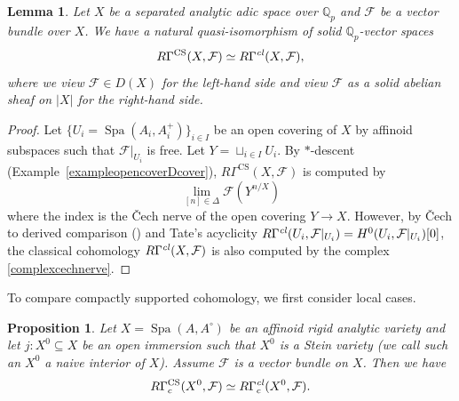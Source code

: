 \documentclass[a4paper,10pt]{amsart}
\theoremstyle{remark}
\theoremstyle{definition}
\theoremstyle{plain}
\newtheorem{lemma}[theorem]{Lemma}
\newtheorem{proposition}[theorem]{Proposition}
\numberwithin{equation}{section}
\newcommand{\bbQ}{{\mathbb Q}}
\newcommand{\calF}{{\mathcal F}}
\newcommand{\CS}{\ensuremath{\mathrm{CS}}}
\DeclareMathOperator{\Spa}{Spa}
\begin{document}
\begin{lemma}\label{comparisoncohomology}
	Let $X$ be a separated analytic adic space over $\bbQ_p$ and $\calF$ be a vector bundle over $X$. We have a natural quasi-isomorphism of solid $\bbQ_p$-vector spaces $$R\Gamma^{\CS}(X,\calF)\simeq R\Gamma^{\it cl}(X,\calF),$$
	where we view $\calF\in D(X)$ for the left-hand side and view $\calF$ as a solid abelian sheaf on $|X|$ for the right-hand side.	
\end{lemma}
\begin{proof}
	Let $\{U_i=\Spa(A_i,A_i^+)\}_{i\in I}$ be an open covering of $X$ by affinoid subspaces such that $\calF|_{U_i}$ is free. Let $Y=\sqcup_{i\in I} U_i$. By $*$-descent (Example~\ref{exampleopencoverDcover}), $R\Gamma^{\CS}(X,\calF)$ is computed by 
	\begin{equation}\label{complexcechnerve}
	\lim_{[n]\in \Delta} \calF(Y^{n/X})
	\end{equation}
	where the index is the \v{C}ech nerve of the open covering $Y\to X$. However, by \v{C}ech to derived comparison (\cite[\href{https://stacks.math.columbia.edu/tag/03F9}{Tag 03F9}]{stacks-project}) and Tate's acyclicity $R\Gamma^{\it cl}(U_i,\calF|_{U_i})=H^0(U_i,\calF|_{U_i})[0]$, the classical cohomology $R\Gamma^{\it cl}(X,\calF)$ is also computed by the complex \eqref{complexcechnerve}.
\end{proof}


To compare compactly supported cohomology, we first consider local cases.


	




\begin{proposition}\label{naiveinterior}
	Let $X=\Spa(A,A^{\circ})$ be an affinoid rigid analytic variety and let $j:X^0\subseteq X$ be an open immersion such that $X^0$ is a Stein variety (we call such an $X^0$ a naive interior of $X$). Assume $\calF$ is a vector bundle on $X$. Then we have 
	$$R\Gamma^{\CS}_c(X^0,\calF)\simeq R\Gamma_c^{\it cl}(X^0,\calF).$$
\end{proposition}
\end{document}
